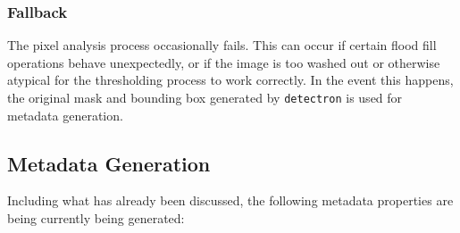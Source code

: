\documentclass[conference]{IEEEtran}
\begin{document}
\subsubsection{Fallback} The pixel analysis process occasionally fails. This can occur if certain flood fill operations behave unexpectedly, or if the image is too washed out or otherwise atypical for the thresholding process to work correctly. In the event this happens, the original mask and bounding box generated by \verb|detectron| is used for metadata generation.
\subsection{Metadata Generation}
Including what has already been discussed, the following metadata properties are being currently being generated:
\end{document}

